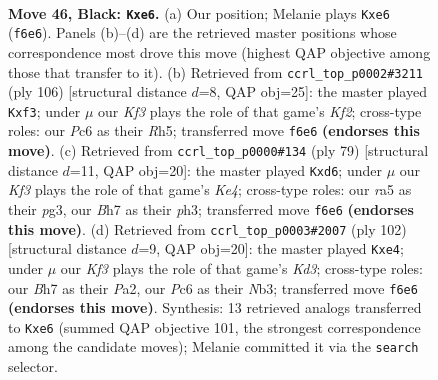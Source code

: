 \documentclass[11pt]{article}
\begin{document}
\clearpage

\begin{figure}[p]\centering
\begin{subfigure}{0.46\textwidth}\centering
\resizebox{\linewidth}{!}{%
\newchessgame
\chessboard[
  setfen={8/7b/2p1Nk2/Rp6/8/8/8/5K2 b - - 0 46},
  showmover=false,
  pgfstyle=straightmove, color=movearrow, markmove={f6-e6}
]}
\caption{}
\end{subfigure}\hfill
\begin{subfigure}{0.46\textwidth}\centering
\resizebox{\linewidth}{!}{%
\newchessgame
\chessboard[
  setfen={2k5/8/8/7R/r7/P4n2/5K2/8 w - - 2 54},
  showmover=false,
  pgfstyle=straightmove, color=movearrow, markmove={f2-f3}
]}
\caption{}
\end{subfigure}
\\[4pt]
\begin{subfigure}{0.46\textwidth}\centering
\resizebox{\linewidth}{!}{%
\newchessgame
\chessboard[
  setfen={8/7p/3N2p1/4k3/8/4K1PP/8/8 b - - 0 40},
  showmover=false,
  pgfstyle=straightmove, color=movearrow, markmove={e5-d6}
]}
\caption{}
\end{subfigure}\hfill
\begin{subfigure}{0.46\textwidth}\centering
\resizebox{\linewidth}{!}{%
\newchessgame
\chessboard[
  setfen={8/2k5/7R/8/4n3/1N1K4/P5r1/8 w - - 11 52},
  showmover=false,
  pgfstyle=straightmove, color=movearrow, markmove={d3-e4}
]}
\caption{}
\end{subfigure}
\caption{\textbf{Move 46, Black: \texttt{Kxe6}.} (a) Our position; Melanie plays \texttt{Kxe6} (\texttt{f6e6}). Panels (b)--(d) are the retrieved master positions whose correspondence most drove this move (highest QAP objective among those that transfer to it). (b) Retrieved from \texttt{ccrl\_top\_p0002\#3211} (ply 106) [structural distance $d$=8, QAP obj=25]: the master played \texttt{Kxf3}; under $\mu$ our \emph{Kf3} plays the role of that game's \emph{Kf2}; cross-type roles: our \emph{P}c6 as their \emph{R}h5; transferred move \texttt{f6e6} \textbf{(endorses this move)}. (c) Retrieved from \texttt{ccrl\_top\_p0000\#134} (ply 79) [structural distance $d$=11, QAP obj=20]: the master played \texttt{Kxd6}; under $\mu$ our \emph{Kf3} plays the role of that game's \emph{Ke4}; cross-type roles: our \emph{r}a5 as their \emph{p}g3, our \emph{B}h7 as their \emph{p}h3; transferred move \texttt{f6e6} \textbf{(endorses this move)}. (d) Retrieved from \texttt{ccrl\_top\_p0003\#2007} (ply 102) [structural distance $d$=9, QAP obj=20]: the master played \texttt{Kxe4}; under $\mu$ our \emph{Kf3} plays the role of that game's \emph{Kd3}; cross-type roles: our \emph{B}h7 as their \emph{P}a2, our \emph{P}c6 as their \emph{N}b3; transferred move \texttt{f6e6} \textbf{(endorses this move)}. Synthesis: 13 retrieved analogs transferred to \texttt{Kxe6} (summed QAP objective 101, the strongest correspondence among the candidate moves); Melanie committed it via the \texttt{search} selector.}
\label{fig:thought-m91}
\end{figure}
\end{document}
